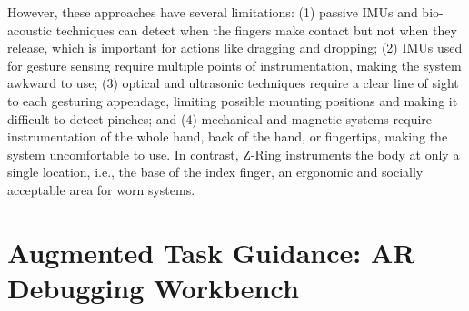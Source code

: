\documentclass [11pt, proquest] {uwthesis}[2020/02/24]
\begin{document}
However, these approaches have several limitations: (1) passive IMUs and bio-acoustic techniques can detect when the fingers make contact  but not when they release, which is important for actions like dragging and dropping; (2) IMUs used for gesture sensing require multiple points of instrumentation, making the system awkward to use; (3) optical and ultrasonic techniques require a clear line of sight to each gesturing appendage, limiting possible mounting positions and making it difficult to detect pinches; and (4) mechanical and magnetic systems require instrumentation of the whole hand, back of the hand, or fingertips, making the system uncomfortable to use.
In contrast, Z-Ring instruments the body at only a single location, i.e., the base of the index finger, an ergonomic and socially acceptable area for worn systems. 
 
 
\chapter{Augmented Task Guidance: AR Debugging Workbench}

\end{document}
